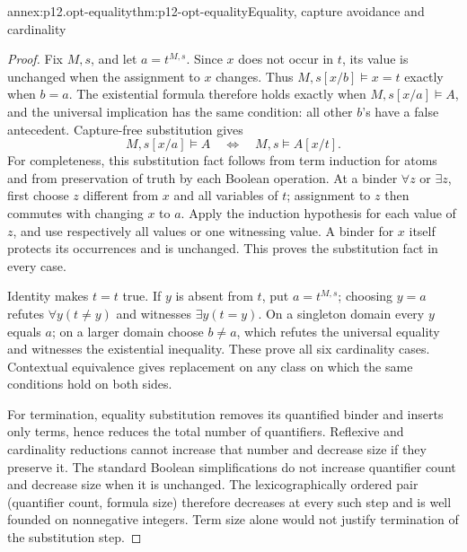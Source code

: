 \begin{annexitem}{annex:p12.opt-equality}{thm:p12-opt-equality}{Equality, capture avoidance and cardinality}
\begin{proof}
Fix \(M,s\), and let \(a=t^{M,s}\).
Since \(x\) does not occur in \(t\), its value is unchanged when
the assignment to \(x\) changes. Thus
\(M,s[x/b]\models x=t\) exactly when \(b=a\).
The existential formula therefore holds exactly when
\(M,s[x/a]\models A\), and the universal implication has the
same condition: all other \(b\)'s have a false antecedent.
Capture-free substitution gives
\[
 M,s[x/a]\models A\quad\Longleftrightarrow\quad M,s\models A[x/t].
\]
For completeness, this substitution fact follows from term induction
for atoms and from preservation of truth by each Boolean operation.
At a binder \(\forall z\) or \(\exists z\), first choose \(z\)
different from \(x\) and all variables of \(t\); assignment to
\(z\) then commutes with changing \(x\) to \(a\).
Apply the induction hypothesis for each value of \(z\), and use
respectively all values or one witnessing value. A binder for \(x\)
itself protects its occurrences and is unchanged. This proves the
substitution fact in every case.

Identity makes \(t=t\) true. If \(y\) is absent from \(t\), put
\(a=t^{M,s}\); choosing \(y=a\) refutes \(\forall y(t\ne y)\)
and witnesses \(\exists y(t=y)\).
On a singleton domain every \(y\) equals \(a\); on a larger domain
choose \(b\ne a\), which refutes the universal equality and
witnesses the existential inequality. These prove all six
cardinality cases. Contextual equivalence gives replacement on
any class on which the same conditions hold on both sides.

For termination, equality substitution removes its quantified
binder and inserts only terms, hence reduces the total number
of quantifiers. Reflexive and cardinality reductions cannot
increase that number and decrease size if they preserve it.
The standard Boolean simplifications do not increase quantifier
count and decrease size when it is unchanged.
The lexicographically ordered pair (quantifier count, formula size)
therefore decreases at every such step and is well founded on
nonnegative integers. Term size alone would not justify termination
of the substitution step.
\end{proof}
\end{annexitem}

